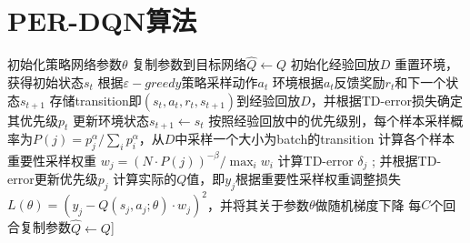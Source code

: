 \documentclass[11pt]{ctexart}
\begin{document}
\section{PER-DQN算法}
\begin{algorithm}[H] %
    \renewcommand{\thealgorithm}{} %
	\caption{} 
    \renewcommand{\algorithmicrequire}{\textbf{输入:}}  
    \renewcommand{\algorithmicensure}{\textbf{输出:}} 
	\begin{algorithmic}[1]
		\STATE 初始化策略网络参数$\theta$ %
		\STATE 复制参数到目标网络$\hat{Q} \leftarrow Q$
		\STATE 初始化经验回放$D$
			\STATE 重置环境，获得初始状态$s_t$
				\STATE 根据$\varepsilon-greedy$策略采样动作$a_t$
				\STATE 环境根据$a_t$反馈奖励$r_t$和下一个状态$s_{t+1}$
				\STATE 存储transition即$(s_t,a_t,r_t,s_{t+1})$到经验回放$D$，并根据TD-error损失确定其优先级$p_t$
				\STATE 更新环境状态$s_{t+1} \leftarrow s_t$
				\STATE 按照经验回放中的优先级别，每个样本采样概率为$P(j)=p_j^\alpha / \sum_i p_i^\alpha$，从$D$中采样一个大小为batch的transition
				\STATE 计算各个样本重要性采样权重 $w_j=(N \cdot P(j))^{-\beta} / \max _i w_i$
				\STATE 计算TD-error $\delta_j$ ; 并根据TD-error更新优先级$p_j$
				\STATE 计算实际的$Q$值，即$y_{j}$\footnotemark[2]
				\STATE 根据重要性采样权重调整损失 $L(\theta)=\left(y_{j}-Q\left(s_{j}, a_{j} ; \theta\right)\cdot w_j \right)^{2}$，并将其关于参数$\theta$做随机梯度下降\footnotemark[3]
			\ENDFOR
			\STATE 每$C$个回合复制参数$\hat{Q}\leftarrow Q$\footnotemark[4]]
		\ENDFOR
	\end{algorithmic}
\end{algorithm}
\clearpage
\end{document}
